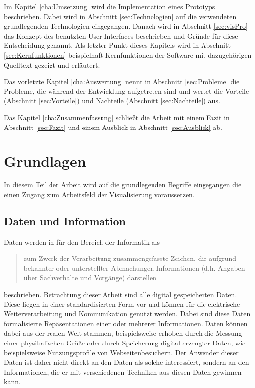 \documentclass[a4paper, 12pt, DIVcalc, onepage, pdftex, headsepline, footsepline]{scrreprt}
\begin{document}
Im Kapitel \ref{cha:Umsetzung} wird die Implementation eines Prototyps beschrieben. Dabei wird in Abschnitt
\ref{sec:Technologien} auf die verwendeten grundlegenden Technologien eingegangen. Danach wird in Abschnitt
\ref{sec:visPro} das Konzept des benutzten User Interfaces beschrieben und Gründe für diese Entscheidung genannt.
Als letzter Punkt dieses Kapitels wird in Abschnitt \ref{sec:Kernfunktionen} beispielhaft Kernfunktionen
der Software mit dazugehörigen Quelltext gezeigt und erläutert.

Das vorletzte Kapitel \ref{cha:Auswertung} nennt in Abschnitt \ref{sec:Probleme} die Probleme, die während
der Entwicklung aufgetreten sind und wertet die Vorteile (Abschnitt \ref{sec:Vorteile}) und Nachteile
(Abschnitt \ref{sec:Nachteile}) aus.

Das Kapitel \ref{cha:Zusammenfassung} schließt die Arbeit mit einem Fazit in Abschnitt \ref{sec:Fazit} und
einem Ausblick in Abschnitt \ref{sec:Ausblick} ab.

\chapter{Grundlagen}
\label{cha:Grundlagen}
In diesem Teil der Arbeit wird auf die grundlegenden Begriffe eingegangen die einen Zugang
zum Arbeitsfeld der Visualisierung voraussetzen.
\section{Daten und Information}
\label{sec:DatenInfo}
Daten werden in \cite{Gabler} für den Bereich der Informatik als
\begin{quote}
zum Zweck der Verarbeitung zusammengefasste Zeichen, die aufgrund bekannter oder unterstellter Abmachungen
Informationen (d.h. Angaben über Sachverhalte und Vorgänge) darstellen
\end{quote}
beschrieben.
Betrachtung dieser Arbeit sind alle digital gespeicherten Daten.
Diese liegen in einer standardisierten Form vor und können für die elektrische Weiterverarbeitung
und Kommunikation genutzt werden. Dabei sind diese Daten formalisierte Repäsentationen einer
oder mehrerer Informationen. Daten können dabei aus der realen Welt stammen, beispielsweise erhoben durch
die Messung einer physikalischen Größe oder durch Speicherung digital erzeugter Daten, wie
beispielsweise Nutzungsprofile von Webseitenbesuchern.
Der Anwender dieser Daten ist daher nicht direkt an den Daten als solche interessiert, sondern
an den Informationen, die er mit verschiedenen Techniken aus diesen Daten gewinnen kann.
\end{document}
